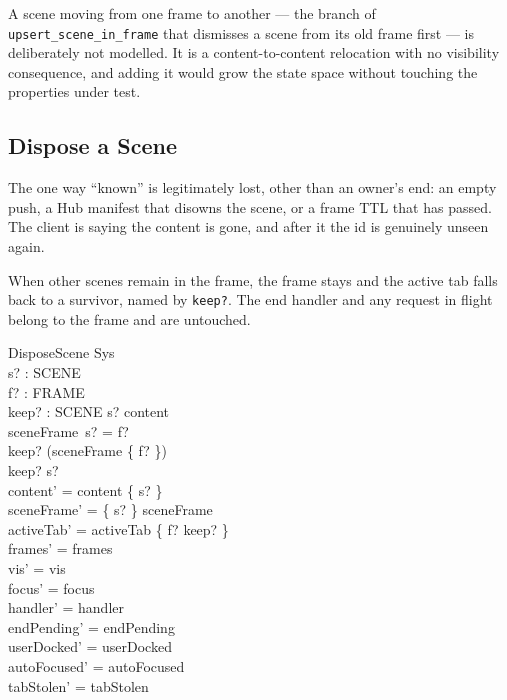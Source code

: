 \documentclass[a4paper,10pt,fleqn]{article}
\begin{document}
A scene moving from one frame to another --- the branch of
\texttt{upsert\_scene\_in\_frame} that dismisses a scene from its old frame
first --- is deliberately not modelled.  It is a content-to-content
relocation with no visibility consequence, and adding it would grow the state
space without touching the properties under test.

\subsection{Dispose a Scene}

The one way ``known'' is legitimately lost, other than an owner's end: an
empty push, a Hub manifest that disowns the scene, or a frame TTL that has
passed.  The client is saying the content is gone, and after it the id is
genuinely unseen again.

When other scenes remain in the frame, the frame stays and the active tab
falls back to a survivor, named by \texttt{keep?}.  The end handler and any
request in flight belong to the frame and are untouched.

\begin{schema}{DisposeScene}
  \Delta Sys \\
  s? : SCENE \\
  f? : FRAME \\
  keep? : SCENE
\where
  s? \in content \\
  sceneFrame~s? = f? \\
  keep? \in \dom (sceneFrame \rres \{ f? \}) \\
  keep? \neq s? \\
  content' = content \setminus \{ s? \} \\
  sceneFrame' = \{ s? \} \ndres sceneFrame \\
  activeTab' = activeTab \oplus \{ f? \mapsto keep? \} \\
  frames' = frames \\
  vis' = vis \\
  focus' = focus \\
  handler' = handler \\
  endPending' = endPending \\
  userDocked' = userDocked \\
  autoFocused' = autoFocused \\
  tabStolen' = tabStolen
\end{schema}
\end{document}
